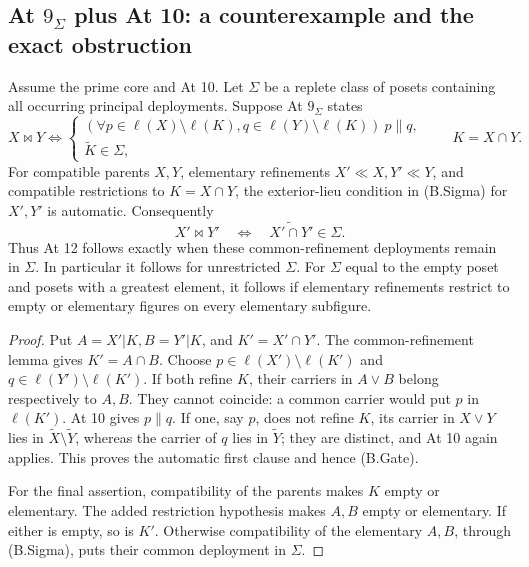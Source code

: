 \subsection{\texorpdfstring{At \(9_\Sigma\)}{At 9(Sigma)} plus At 10: a counterexample and the exact obstruction}

\begin{theorem}
\label{SA21-B-Sigma-gate}
Assume the prime core and At 10. Let \(\Sigma\) be a replete class of
posets containing all occurring principal deployments. Suppose
At \(9_\Sigma\) states
\[
 X\bowtie Y\Longleftrightarrow
 \left\{
 \begin{array}{l}
 (\forall p\in\ell(X)\setminus\ell(K),
            q\in\ell(Y)\setminus\ell(K))\ p\parallel q,\\
 \widetilde K\in\Sigma,
 \end{array}\right.
 \qquad K=X\cap Y.                                  \tag{B.Sigma}
\]
For compatible parents \(X,Y\), elementary refinements
\(X'\ll X,Y'\ll Y\), and compatible restrictions to \(K=X\cap Y\),
the exterior-lieu condition in (B.Sigma) for \(X',Y'\) is automatic.
Consequently
\[
 X'\bowtie Y'
 \quad\Longleftrightarrow\quad
 \widetilde{X'\cap Y'}\in\Sigma.                     \tag{B.Gate}
\]
Thus At 12 follows exactly when these common-refinement deployments
remain in \(\Sigma\). In particular it follows for unrestricted
\(\Sigma\). For \(\Sigma\) equal to the empty poset and posets with
a greatest element, it follows if elementary refinements restrict
to empty or elementary figures on every elementary subfigure.
\end{theorem}

\begin{proof}
Put \(A=X'|K,B=Y'|K\), and \(K'=X'\cap Y'\). The common-refinement
lemma gives \(K'=A\cap B\). Choose
\(p\in\ell(X')\setminus\ell(K')\) and
\(q\in\ell(Y')\setminus\ell(K')\).
If both refine \(K\), their carriers in \(A\vee B\) belong
respectively to \(A,B\). They cannot coincide: a common carrier
would put \(p\) in \(\ell(K')\). At 10 gives \(p\parallel q\).
If one, say \(p\), does not refine \(K\), its carrier in
\(X\vee Y\) lies in \(\widetilde X\setminus\widetilde Y\), whereas
the carrier of \(q\) lies in \(\widetilde Y\); they are distinct,
and At 10 again applies. This proves the automatic first clause
and hence (B.Gate).

For the final assertion, compatibility of the parents makes
\(K\) empty or elementary. The added restriction hypothesis makes
\(A,B\) empty or elementary. If either is empty, so is \(K'\).
Otherwise compatibility of the elementary \(A,B\), through
(B.Sigma), puts their common deployment in \(\Sigma\).
\end{proof}

